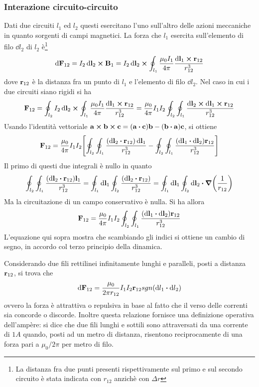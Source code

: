 \subsubsection{Interazione circuito-circuito}
Dati due circuiti $l_1$ ed $l_2$ questi esercitano l'uno sull'altro delle azioni meccaniche in quanto
sorgenti di campi magnetici. La forza che $l_1$ esercita sull'elemento di filo $\dd{l_2}$ di
$l_2$ è\footnote{La distanza fra due punti presenti rispettivamente sul primo e sul secondo circuito
è stata indicata con $r_{12}$ anzichè con $\Delta r$}
\[
    \dd{\vb{F}_{12}}=I_2\dd{\vb{l}_2}\cp\vb{B}_1=I_2\dd{\vb{l}_2}\cp\oint_{l_1}\frac{\mu_0I_1}{4\pi}\frac{\dd{\vb{l}_1}\cp\vb{r}_{12}}{r^3_{12}}
\]
dove $\vb{r}_{12}$ è la distanza fra un punto di $l_1$ e l'elemento di filo $\dd{l_2}$.
Nel caso in cui i due circuiti siano rigidi si ha
\[
    \vb{F}_{12}=\oint_{l_2}I_2\dd{\vb{l}_2}\cp\oint_{l_1}\frac{\mu_0I_1}{4\pi}\frac{\dd{\vb{l}_1}\cp\vb{r}_{12}}{r^3_{12}}=
    \frac{\mu_0}{4\pi}I_1 I_2 \oint_{l_2}\oint_{l_1}\frac{\dd{\vb{l}_2}\cp\dd{\vb{l}_1}\cp\vb{r}_{12}}{r^3_{12}}
\]
Usando l'identità vettoriale  $\vb{a}\cp\vb{b}\cp\vb{c}=(\vb{a}\vdot\vb{c})\vb{b}-(\vb{b}\vdot\vb{a})\vb{c}$, si ottiene
\[
    \vb{F}_{12}=\frac{\mu_0}{4\pi}I_1 I_2 \Biggl[\oint_{l_2}\oint_{l_1}\frac{(\dd{\vb{l}_2}\vdot\vb{r}_{12})\dd{\vb{l}_1}}{r^3_{12}}-
    \oint_{l_2}\oint_{l_1}\frac{(\dd{\vb{l}_1}\vdot\dd{\vb{l}_2})\vb{r}_{12}}{r^3_{12}}\Biggr]
\]
Il primo di questi due integrali è nullo in quanto
\[
    \oint_{l_2}\oint_{l_1}\frac{(\dd{\vb{l}_2}\vdot\vb{r}_{12})\vb{l}_1}{r^3_{12}}=
    \oint_{l_1}\dd{\vb{l}_1}\oint_{l_2}\frac{(\dd{\vb{l}_2}\vdot\vb{r}_{12})}{r^3_{12}}=
    \oint_{l_1}\dd{\vb{l}_1}\oint_{l_2}\dd{\vb{l}_2}\vdot\grad(\rec{r_{12}})
\]
Ma la circuitazione di un campo conservativo è nulla.
Si ha allora
\begin{equation}
    \vb{F}_{12}=\frac{\mu_0}{4\pi}I_1 I_2 \oint_{l_2}\oint_{l_1}\frac{(\dd{\vb{l}_1}\vdot\dd{\vb{l}_2})\vb{r}_{12}}{r^3_{12}}
\end{equation}
L'equazione qui sopra mostra che scambiando gli indici si ottiene un cambio di segno, in accordo col terzo principio della dinamica.

Considerando due fili rettilinei infinitamente lunghi e paralleli, posti a distanza $\vb{r}_{12}$, si trova che
\[
    \dd{\vb{F}_{12}}=\frac{\mu_0}{2\pi r_{12}}I_1 I_2\vb{r}_{12} sgn(\dd{l_1}\vdot\dd{l_2})
\]
ovvero la forza è attrattiva o repulsiva in base al fatto che il verso delle correnti sia concorde o discorde.
Inoltre questa relazione fornisce una definizione operativa dell'ampère: si dice che due fili lunghi e sottili
sono attraversati da una corrente di $1A$ quando, posti ad un metro di distanza, risentono reciprocamente di
una forza pari a $\mu_0/2\pi$ per metro di filo.
